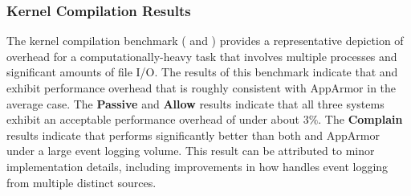\subsubsection{Kernel Compilation Results}

The kernel compilation benchmark ( and
) provides a representative depiction of overhead for
a computationally-heavy task that involves multiple processes and significant amounts of
file I/O. The results of this benchmark indicate that \bpfbox{} and \bpfcontain{} exhibit
performance overhead that is roughly consistent with AppArmor in the average case. The
\textbf{Passive} and \textbf{Allow} results indicate that all three systems exhibit an
acceptable performance overhead of under about $3\%$. The \textbf{Complain} results
indicate that \bpfcontain{} performs significantly better than both \bpfbox{} and AppArmor
under a large event logging volume. This result can be attributed to minor implementation
details, including improvements in how \bpfcontain{} handles event logging from multiple
distinct sources.





